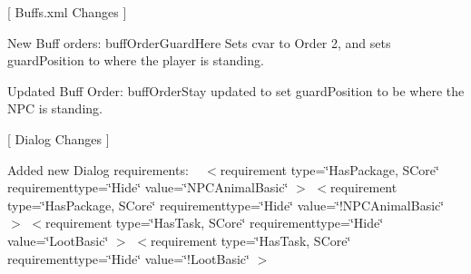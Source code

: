 \mbox{[} Buffs.\+xml Changes \mbox{]}
\begin{DoxyItemize}
\item New Buff orders\+: buff\+Order\+Guard\+Here Sets cvar to Order 2, and sets guard\+Position to where the player is standing.
\item Updated Buff Order\+: buff\+Order\+Stay updated to set guard\+Position to be where the NPC is standing.
\end{DoxyItemize}

\mbox{[} Dialog Changes \mbox{]}
\begin{DoxyItemize}
\item Added new Dialog requirements\+: ~\newline
 $<$requirement type=\char`\"{}\+Has\+Package, SCore\char`\"{} requirementtype=\char`\"{}\+Hide\char`\"{} value=\char`\"{}\+NPCAnimal\+Basic\char`\"{} $>$ $<$requirement type=\char`\"{}\+Has\+Package, SCore\char`\"{} requirementtype=\char`\"{}\+Hide\char`\"{} value=\char`\"{}!\+NPCAnimal\+Basic\char`\"{} $>$ $<$requirement type=\char`\"{}\+Has\+Task, SCore\char`\"{} requirementtype=\char`\"{}\+Hide\char`\"{} value=\char`\"{}\+Loot\+Basic\char`\"{} $>$ $<$requirement type=\char`\"{}\+Has\+Task, SCore\char`\"{} requirementtype=\char`\"{}\+Hide\char`\"{} value=\char`\"{}!\+Loot\+Basic\char`\"{} $>$
\end{DoxyItemize}

